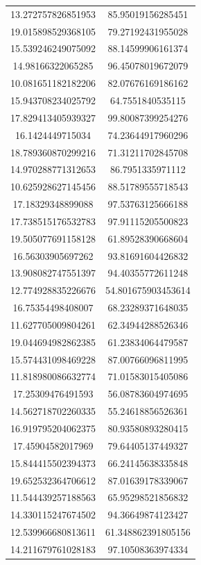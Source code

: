 \begin{table}
\begin{tabular}{cc}
13.272757826851953 & 85.95019156285451 \\
19.015898529368105 & 79.27192431955028 \\
15.539246249075092 & 88.14599906161374 \\
14.98166322065285 & 96.45078019672079 \\
10.081651182182206 & 82.07676169186162 \\
15.943708234025792 & 64.7551840535115 \\
17.829413405939327 & 99.80087399254276 \\
16.1424449715034 & 74.23644917960296 \\
18.789360870299216 & 71.31211702845708 \\
14.970288771312653 & 86.7951335971112 \\
10.625928627145456 & 88.51789555718543 \\
17.18329348899088 & 97.53763125666188 \\
17.738515176532783 & 97.91115205500823 \\
19.505077691158128 & 61.89528390668604 \\
16.56303905697262 & 93.81691604426832 \\
13.908082747551397 & 94.40355772611248 \\
12.774928835226676 & 54.801675903453614 \\
16.75354498408007 & 68.23289371648035 \\
11.627705009804261 & 62.34944288526346 \\
19.044694982862385 & 61.23834064479587 \\
15.574431098469228 & 87.00766096811995 \\
11.818980086632774 & 71.01583015405086 \\
17.25309476491593 & 56.08783604974695 \\
14.562718702260335 & 55.24618856526361 \\
16.919795204062375 & 80.93580893280415 \\
17.45904582017969 & 79.64405137449327 \\
15.844415502394373 & 66.24145638335848 \\
19.652532364706612 & 87.01639178339067 \\
11.544439257188563 & 65.95298521856832 \\
14.330115247674502 & 94.36649874123427 \\
12.539966680813611 & 61.348862391805156 \\
14.211679761028183 & 97.10508363974334 \\

\end{tabular}
\end{table}
